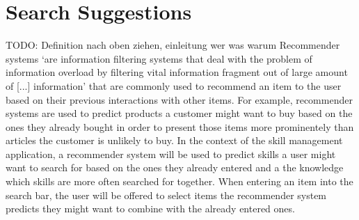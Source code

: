 \section{Search Suggestions}
TODO: Definition nach oben ziehen, einleitung wer was warum
Recommender systems `are information filtering systems that deal with the problem of information overload by filtering vital information fragment out of large amount of [...] information' \cite{Isinkaye2015261} that are commonly used to recommend an item to the user based on their previous interactions with other items. For example, recommender systems are used to predict products a customer might want to buy based on the ones they already bought in order to present those items
more prominentely than articles the customer is unlikely to buy. In the context of the skill management application, a recommender system will be used to predict skills a user might want to search for based on the ones they already entered and a the knowledge which skills are more often searched for together.
When entering an item into the search bar, the user will be offered to select items the recommender system predicts they might want to combine with the already entered ones.

